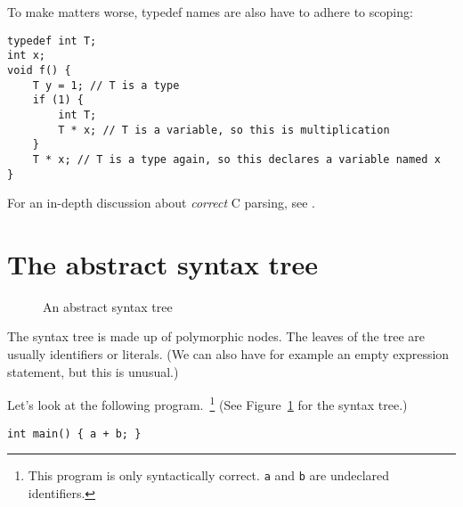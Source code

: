 \documentclass[12pt]{article}
\begin{document}
To make matters worse, typedef names are also have to adhere to scoping:
\begin{center}
\begin{BVerbatim}
typedef int T;
int x;
void f() {
	T y = 1; // T is a type
	if (1) {
		int T;
		T * x; // T is a variable, so this is multiplication
	}
	T * x; // T is a type again, so this declares a variable named x
}
\end{BVerbatim}
\end{center}

For an in-depth discussion about \emph{correct} C parsing, see
\cite{c11_parsing}.

\section{The abstract syntax tree}

\begin{figure}
\centering
{}
\caption{An abstract syntax tree}
\label{fig:ast}
\end{figure}

The syntax tree is made up of polymorphic nodes. The leaves of the tree are
usually identifiers or literals. (We can also have for example an empty
expression statement, but this is unusual.)

Let's look at the following program.~\footnote{This program is only
syntactically correct. \texttt{a} and \texttt{b} are undeclared identifiers.}
(See Figure~\ref{fig:ast} for the syntax tree.)
\begin{center}
\begin{BVerbatim}
int main() { a + b; }
\end{BVerbatim}
\end{center}
\end{document}

